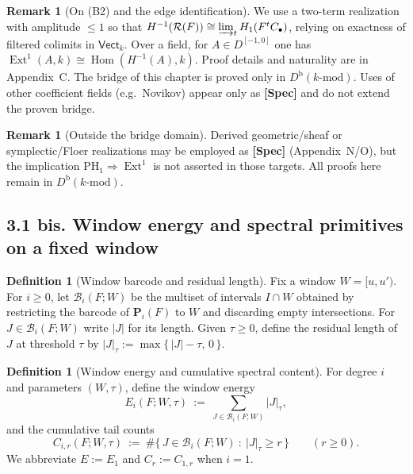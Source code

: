 \documentclass[11pt]{article}
\numberwithin{equation}{section}
\theoremstyle{plain}
\theoremstyle{definition}
\theoremstyle{remark}
\DeclareMathOperator{\Ext}{Ext}
\DeclareMathOperator{\Hom}{Hom}
\theoremstyle{plain}
\theoremstyle{definition}
\numberwithin{equation}{section}
\theoremstyle{definition}
\newtheorem{definition}[theorem]{Definition}
\newtheorem{remark}[theorem]{Remark}
\numberwithin{equation}{section}
\theoremstyle{plain}
\theoremstyle{definition}
\theoremstyle{remark}
\begin{document}
\begin{remark}[On (B2) and the edge identification]\label{rk:B2-edge}
We use a two-term realization with amplitude \(\le 1\) so that \(H^{-1}(\mathcal{R}(F))\cong \varinjlim_t H_1(F^tC_\bullet)\), relying on exactness of filtered colimits in \(\mathsf{Vect}_k\). Over a field, for \(A\in D^{[-1,0]}\) one has \(\Ext^1(A,k)\cong \Hom(H^{-1}(A),k)\). Proof details and naturality are in Appendix~C. The bridge of this chapter is proved only in \(D^{\mathrm{b}}(k\text{-mod})\). Uses of other coefficient fields (e.g.\ Novikov) appear only as \textbf{[Spec]} and do not extend the proven bridge.
\end{remark}

\begin{remark}[Outside the bridge domain]\label{rk:outside-bridge}
Derived geometric/sheaf or symplectic/Floer realizations may be employed as \textbf{[Spec]} (Appendix~N/O), but the implication \(\mathrm{PH}_1\Rightarrow\Ext^1\) is not asserted in those targets. All proofs here remain in \(D^{\mathrm{b}}(k\text{-mod})\).
\end{remark}

\subsection*{3.1 bis. Window energy and spectral primitives on a fixed window}
\begin{definition}[Window barcode and residual length]
Fix a window \(W=[u,u')\). For \(i\ge 0\), let \(\mathcal{B}_i(F;W)\) be the multiset of intervals \(I\cap W\) obtained by restricting the barcode of \(\mathbf{P}_i(F)\) to \(W\) and discarding empty intersections. For \(J\in\mathcal{B}_i(F;W)\) write \(|J|\) for its length.
Given \(\tau\ge 0\), define the residual length of \(J\) at threshold \(\tau\) by \(|J|_\tau:=\max\{\,|J|-\tau,\,0\,\}\).
\end{definition}

\begin{definition}[Window energy and cumulative spectral content]
For degree \(i\) and parameters \((W,\tau)\), define the window energy
\[
E_i(F;W,\tau)\ :=\ \sum_{J\in\mathcal{B}_i(F;W)} |J|_\tau,
\]
and the cumulative tail counts
\[
C_{i,r}(F;W,\tau)\ :=\ \#\{\,J\in\mathcal{B}_i(F;W)\ :\ |J|_\tau\ge r\,\}\qquad(r\ge 0).
\]
We abbreviate \(E:=E_1\) and \(C_r:=C_{1,r}\) when \(i=1\).
\end{definition}
\end{document}
